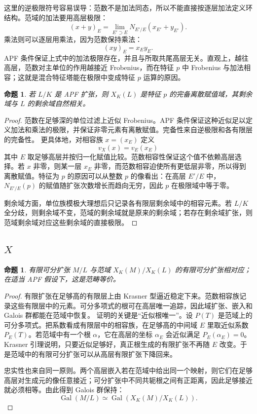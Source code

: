 \documentclass[11pt,a4paper,openany]{ctexbook}
\numberwithin{equation}{chapter}
\newcommand{\Gal}{\operatorname{Gal}}
\theoremstyle{plain}
\newtheorem{proposition}[theorem]{命题}
\theoremstyle{definition}
\theoremstyle{remark}
\begin{document}
这里的逆极限符号容易误导：范数不是加法同态，所以不能直接按逐层加法定义环结构。范域的加法要用高层极限：
\[
(x+y)_E=\lim_{E'\supset E}N_{E'/E}(x_{E'}+y_{E'}).
\]
乘法则可以逐层用乘法，因为范数保持乘法：
\[
(xy)_E=x_Ey_E.
\]
APF 条件保证上式中的加法极限存在，并且与所取共尾高层无关。直观上，越往高层，范数对主单位的作用越接近 Frobenius，而在特征 $p$ 中 Frobenius 与加法相容；这就是混合特征塔能在极限中变成特征 $p$ 运算的原因。

\begin{proposition}
若 $L/K$ 是 APF 扩张，则 $X_K(L)$ 是特征 $p$ 的完备离散赋值域，其剩余域与 $L$ 的剩余域自然相关。
\end{proposition}

\begin{proof}
范数在足够深的单位过滤上近似 Frobenius。APF 条件保证这种近似足以定义加法和乘法的极限，并保证非零元素有离散赋值。完备性来自逆极限和各有限层的完备性。
更具体地，对相容族 $x=(x_E)$ 定义
\[
v_X(x)=v_E(x_E)
\]
其中 $E$ 取足够高层并按归一化赋值比较。范数相容性保证这个值不依赖高层选择。若 $x$ 非零，则某一层 $x_E$ 非零，而范数相容迫使所有更低层非零，所以得到离散赋值。特征为 $p$ 的原因可以从整数 $p$ 的像看出：在高层 $E'/E$ 中，$N_{E'/E}(p)$ 的赋值随扩张次数增长而趋向无穷，因此 $p$ 在极限域中等于零。

剩余域方面，单位族模极大理想后只记录各有限层剩余域中的相容元素。若 $L/K$ 全分歧，则剩余域不变，范域的剩余域就是原来的剩余域；若存在剩余域扩张，则范域剩余域对应这些剩余域的直接极限。
\end{proof}

\subsection{\texorpdfstring{$X$}{X}}

\begin{proposition}
有限可分扩张 $M/L$ 与范域 $X_K(M)/X_K(L)$ 的有限可分扩张相对应；在适当 APF 假设下，这是范畴等价。
\end{proposition}

\begin{proof}
有限扩张在足够高的有限层上由 Krasner 型逼近稳定下来。范数相容族记录这些有限层中的元素。可分多项式的根可在高层唯一追踪，因此域扩张、嵌入和 Galois 群都能在范域中恢复。
证明的关键是“近似根唯一”。设 $P(T)$ 是范域上的可分多项式。把系数看成有限层中的相容族，在足够高的中间域 $E$ 里取近似系数 $P_E(T)$。若范域中有一个根 $\alpha$，它在高层的坐标 $\alpha_E$ 会近似满足 $P_E(\alpha_E)=0$。Krasner 引理说明，只要近似足够好，真正根生成的有限扩张不再随 $E$ 改变。于是范域中的有限可分扩张可以从高层有限扩张下降回来。

忠实性也来自同一原则。两个高层嵌入若在范域中给出同一个映射，则它们在足够高层对生成元的像任意接近；可分扩张中不同共轭根之间有正距离，因此足够接近就必须相等。由此得到 Galois 群保持：
\[
\Gal(M/L)\simeq \Gal(X_K(M)/X_K(L)).
\]
\end{proof}
\end{document}
